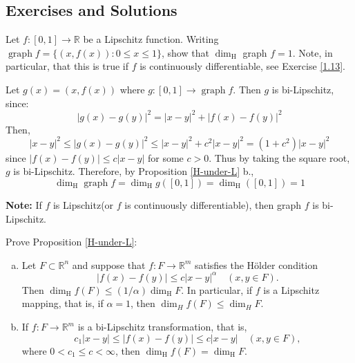 \documentclass[12pt, a4paper]{article}
\begin{document}
\subsection{Exercises and Solutions}
\begin{customexercise}{3.7}
    Let $f:[0,1] \rightarrow \mathbb{R}$ be a Lipschitz function. Writing $\operatorname{graph} f=\{(x, f(x)): 0 \leq x \leq 1\}$, show that $\operatorname{dim}_{\mathrm{H}}$ graph $f=1 .$ Note, in
particular, that this is true if $f$ is continuously differentiable, see Exercise \ref{1.13}.
\end{customexercise}
\begin{customsol}{3.7}
   Let $g(x)=(x, f(x))$ where $g:[0,1] \rightarrow \operatorname{graph} f$. Then $g$ is bi-Lipschitz, since:
$$
|g(x)-g(y)|^{2}=|x-y|^{2}+|f(x)-f(y)|^{2}
$$
Then,
$$
|x-y|^{2} \leq|g(x)-g(y)|^{2} \leq|x-y|^{2}+c^{2}|x-y|^{2}=\left(1+c^{2}\right)|x-y|^{2}
$$
since $|f(x)-f(y)| \leq c|x-y|$ for some $c>0$. Thus by taking the square root, $g$ is bi-Lipschitz. Therefore, by Proposition \ref{H-under-L} b., 
$$\operatorname{dim}_{\mathrm{H}} \operatorname{graph} f = \operatorname{dim}_{\mathrm{H}} g([0,1]) = \operatorname{dim}_{\mathrm{H}}([0,1]) = 1$$
\end{customsol}

\textbf{Note: }If $f$ is Lipschitz(or $f$ is continuously differentiable), then graph $f$ is bi-Lipschitz. 


\begin{customexercise}{}
    Prove Proposition \ref{H-under-L}:
    \begin{enumerate}[(a)]
        \item Let $F \subset \mathbb{R}^{n}$ and suppose that $f: F \rightarrow \mathbb{R}^{m}$ satisfies the Hölder condition
$$
|f(x)-f(y)| \leq c|x-y|^{\alpha} \quad(x, y \in F) .
$$
Then $\operatorname{dim}_{\mathrm{H}} f(F) \leq(1 / \alpha) \operatorname{dim}_{\mathrm{H}} F .$ In particular, if $f$ is a Lipschitz
mapping, that is, if $\alpha=1$, then $\operatorname{dim}_{H} f(F) \leq \operatorname{dim}_{H} F$.
\item If $f: F \rightarrow \mathbb{R}^{m}$ is a bi-Lipschitz transformation, that is,
$$
c_{1}|x-y| \leq|f(x)-f(y)| \leq c|x-y| \quad(x, y \in F),
$$
where $0<c_{1} \leq c<\infty$, then $\operatorname{dim}_{\mathrm{H}} f(F)=\operatorname{dim}_{\mathrm{H}} F$.
    \end{enumerate}
\end{customexercise}
\end{document}

